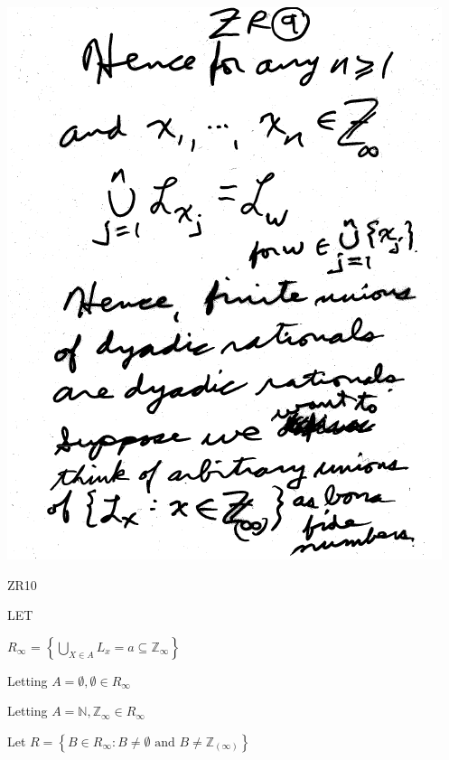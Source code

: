 \documentclass[10pt,a4paper]{article}
\begin{document}
{{\includegraphics[scale=0.6]{pages/ZR9.png}

\newpage

ZR10



LET 

$R_{\infty}$ = $\left\{\bigcup_{X\in A} L_{x} = a\subseteq\mathbb{Z}_{\infty}\right\}$
         
            

Letting $A=\emptyset, \emptyset\in R_{\infty}$ 

Letting $A=\mathbb{N}, \mathbb{Z}_{\infty}\in R_{\infty}$

Let $R=\left\{B\in R_{\infty}:B\neq\emptyset \mbox{ and } B\neq\mathbb{Z}_{(\infty)}\right\}$  

}}
\end{document}
